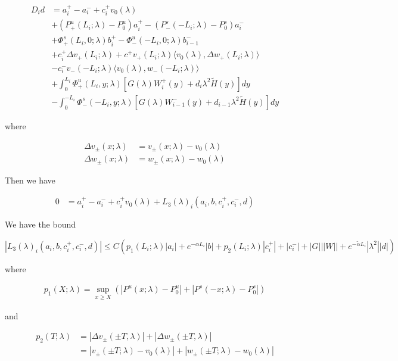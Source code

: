 \documentclass[12pt]{article}
\begin{document}
\begin{enumerate}
\begin{align*}
D_i d &= a_i^+ - a_i^- + c_i^+ v_0(\lambda) \\
&+ (P^u_+(L_i; \lambda) - P_0^u)a_i^+ - (P^s_-(-L_i; \lambda) - P_0^s)a_i^- \\
&+ \Phi^s_+(L_i, 0; \lambda)b_i^+ - \Phi^u_-(-L_i, 0; \lambda)b_{i-1}^- \\
&+ c_i^+ \Delta v_+(L_i; \lambda) + c^+ v_+(L_i; \lambda) \langle v_0(\lambda), \Delta w_+(L_i; \lambda) \rangle \\
&- c_i^- v_-(-L_i; \lambda) \langle v_0(\lambda), w_-(-L_i; \lambda) \rangle \\
&+ \int_0^{L_i} \Phi^u_+(L_i, y; \lambda) [ G(\lambda)W_i^+(y) + d_i \lambda^2 \tilde{H}(y) ] dy \\
&- \int_0^{-L_i} \Phi^s_-(-L_i, y; \lambda) [ G(\lambda)W_{i-1}^-(y) + d_{i-1} \lambda^2 \tilde{H}(y) ] dy
\end{align*}

where

\begin{align*}
\Delta v_\pm(x; \lambda) &= v_\pm(x; \lambda) - v_0(\lambda) \\
\Delta w_\pm(x; \lambda) &= w_\pm(x; \lambda) - w_0(\lambda)
\end{align*}

Then we have 

\begin{align*}
0 &= a_i^+ - a_i^- + c_i^+ v_0(\lambda) + L_3(\lambda)_i(a_i, b, c_i^+, c_i^-, d)
\end{align*}

We have the bound 

\[
|L_3(\lambda)_i(a_i, b, c_i^+, c_i^-, d)| \leq C ( p_1(L_i; \lambda)|a_i|
+ e^{-\alpha L_i}|b| + p_2(L_i; \lambda)|c_i^+| + |c_i^-| + |G| ||W|| + e^{-\tilde{\alpha} L_i} |\lambda^2| |d| )
\]

where

\begin{align*}
p_1(X;\lambda) = \sup_{x \geq X} (|P^u(x;\lambda) - P_0^u| + |P^s(-x;\lambda) - P_0^s|)
\end{align*}

and

\begin{align*}
p_2(T; \lambda) &= |\Delta v_\pm(\pm T, \lambda)| + |\Delta w_\pm(\pm T, \lambda)|\\
&= |v_\pm(\pm T; \lambda) - v_0(\lambda)| + |w_\pm(\pm T; \lambda) - w_0(\lambda)|
\end{align*}


\end{enumerate}
\end{document}
